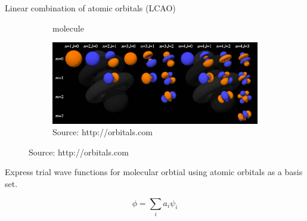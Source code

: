 \documentclass[aspectratio=169]{beamer}
\begin{document}
    \begin{frame}{Linear combination of atomic orbitals (LCAO)}

        \begin{figure}
            \begin{subfigure}{0.45\textwidth}
                \begin{modiagram}
                \end{modiagram}
                \caption{ molecule}
            \end{subfigure}
            \begin{subfigure}{0.45\textwidth}
                \includegraphics[width=\linewidth]{lectures/figures/2_atomic_orbitals.png}
                \caption{Source: http://orbitals.com}
            \end{subfigure}
        \end{figure}
        Express trial wave functions for molecular orbtial using atomic orbitals as a basis set.

        \begin{equation*}
            \phi = \sum_i a_i \psi_i
        \end{equation*}

    \end{frame}
\end{document}

